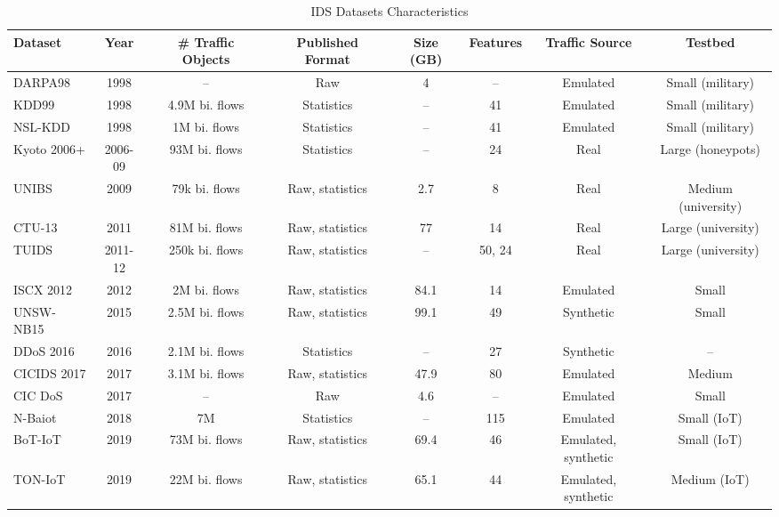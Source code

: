 \documentclass[lettersize,journal]{IEEEtran}
\begin{document}
\begin{table*}[t]
    \centering
    \caption{IDS Datasets Characteristics}
    \label{tab:ids_datasets_survey}
    \begin{tabularx}{\textwidth}{l>{\hsize=1.23cm}CCC>{\hsize=1.25cm}C>{\hsize=1.15cm}C>{\hsize=2.3cm}C>{\hsize=2.6cm}C} 
        \toprule
        \textbf{Dataset} & \textbf{Year} & \textbf{\# Traffic Objects} & \textbf{Published Format} & \textbf{Size (GB)} & \textbf{Features} & \textbf{Traffic Source} & \textbf{Testbed} \\
        \midrule
        DARPA98 & 1998 & -- & Raw & 4 & -- & Emulated & Small (military) \\ 
        KDD99 & 1998 & 4.9M bi. flows & Statistics & -- & 41 & Emulated & Small (military) \\
        NSL-KDD & 1998 & 1M bi. flows & Statistics & -- & 41 & Emulated & Small (military) \\
        Kyoto 2006+ & 2006-09 & 93M bi. flows & Statistics & -- & 24 & Real & Large (honeypots) \\ UNIBS & 2009 & 79k bi. flows & Raw, statistics & 2.7 & 8 & Real & Medium (university) \\  
        CTU-13 & 2011 & 81M bi. flows & Raw, statistics & 77 & 14 & Real & Large (university) \\ TUIDS & 2011-12 & 250k bi. flows & Raw, statistics & -- & 50, 24 & Real & Large (university) \\  ISCX 2012 & 2012 & 2M bi. flows & Raw, statistics & 84.1 & 14 & Emulated & Small \\ UNSW-NB15 & 2015 & 2.5M bi. flows & Raw, statistics & 99.1 & 49 & Synthetic & Small \\ 
        DDoS 2016 & 2016 & 2.1M bi. flows & Statistics & -- & 27 & Synthetic & -- \\ CICIDS 2017 & 2017 & 3.1M bi. flows & Raw, statistics & 47.9 & 80 & Emulated & Medium \\
        CIC DoS & 2017 & -- & Raw & 4.6 & -- & Emulated & Small \\
        N-Baiot & 2018 & 7M  & Statistics & -- & 115 & Emulated & Small (IoT) \\
        BoT-IoT & 2019 & 73M bi. flows & Raw, statistics & 69.4 & 46 & Emulated, synthetic & Small (IoT) \\
        TON-IoT & 2019 & 22M bi. flows & Raw, statistics & 65.1 & 44 & Emulated, synthetic & Medium (IoT) \\

\end{tabularx}
\end{table*}
\end{document}

